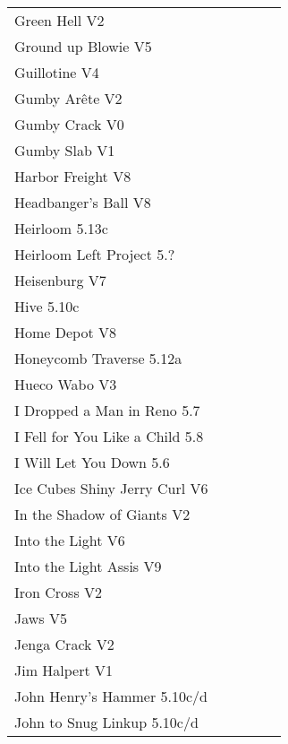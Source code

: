 \begin{flushleft}
\begin{center}
\begin{supertabular}{p{0.76\linewidth}p{0.08\linewidth}}
Green Hell V2 & \pageref{rt:Green Hell} \\
Ground up Blowie V5 & \pageref{rt:Ground up Blowie} \\
Guillotine V4 & \pageref{rt:Guillotine} \\
Gumby Arête V2 & \pageref{rt:Gumby Arête} \\
Gumby Crack V0 & \pageref{rt:Gumby Crack} \\
Gumby Slab V1 & \pageref{rt:Gumby Slab} \\
Harbor Freight V8 & \pageref{vr:Harbor Freight} \\
Headbanger's Ball V8 & \pageref{rt:Hanging Prow Project} \\
Heirloom 5.13c & \pageref{rt:Heirloom} \\
Heirloom Left Project 5.? & \pageref{vr:Heirloom Left Project} \\
Heisenburg V7 & \pageref{rt:Heisenburg} \\
Hive 5.10c & \pageref{rt:Hive} \\
Home Depot V8 & \pageref{vr:Harbor Freight Right Exit} \\
Honeycomb Traverse 5.12a & \pageref{vr:Honeycomb Traverse} \\
Hueco Wabo V3 & \pageref{rt:Hueco Wabo} \\
I Dropped a Man in Reno 5.7 & \pageref{rt:I Dropped a Man in Reno} \\
I Fell for You Like a Child 5.8 & \pageref{rt:I Fell for You Like a Child} \\
I Will Let You Down 5.6 & \pageref{rt:I Will Let You Down} \\
Ice Cubes Shiny Jerry Curl V6 & \pageref{rt:Ice Cubes Shiny Jerry Curl} \\
In the Shadow of Giants V2 & \pageref{rt:In the Shadow of Giants} \\
Into the Light V6 & \pageref{rt:Into the Light} \\
Into the Light Assis V9 & \pageref{vr:Into the Light Assis} \\
Iron Cross V2 & \pageref{vr:Iron Cross} \\
Jaws V5 & \pageref{rt:Jaws} \\
Jenga Crack V2 & \pageref{vr:Crack 2} \\
Jim Halpert V1 & \pageref{rt:Jim Halpert} \\
John Henry's Hammer 5.10c/d & \pageref{rt:John Henry's Hammer} \\
John to Snug Linkup 5.10c/d & \pageref{vr:John to Snug Linkup} \\

\end{supertabular}
\end{center}
\end{flushleft}
